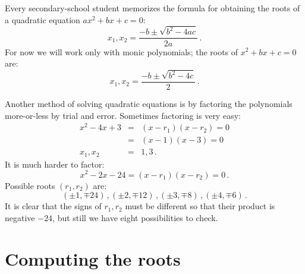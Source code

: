\documentclass[12pt,a4paper]{article}
\begin{document}
Every secondary-school student memorizes the formula for obtaining the roots of a quadratic equation $ax^2+bx+c=0$:
\[
x_1, x_2 = \frac{-b\pm\sqrt{b^2-4ac}}{2a}\,.
\]
For now we will work only with monic polynomials; the roots of $x^2+bx+c=0$ are:
\[
x_1, x_2 = \frac{-b\pm\sqrt{b^2-4c}}{2}\,.
\]


Another method of solving quadratic equations is by factoring the polynomials more-or-less by trial and error. Sometimes factoring is very easy:
\begin{eqnarray*}
x^2-4x+3& =& (x-r_1)(x-r_2)=0\\
& =& (x-1)(x-3)=0\\
x_1,x_2&=&1, 3\,.
\end{eqnarray*}
It is much harder to factor:
\[
x^2-2x-24= (x-r_1)(x-r_2)=0\,.
\]
Possible roots $(r_1,r_2)$ are:
\[
(\pm 1,\mp 24)\,, (\pm 2,\mp 12)\,, (\pm 3,\mp 8)\,, (\pm 4,\mp 6)\,.
\]
It is clear that the signs of $r_1,r_2$ must be different so that their product is negative $-24$, but still we have eight possibilities to check.

\section{Computing the roots}\label{s.computing}
\end{document}
